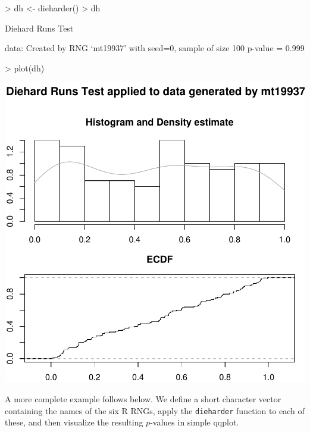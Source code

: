 \documentclass[12pt]{article}
\begin{document}
\begin{center}
\begin{footnotesize}
%
\begin{Schunk}
\begin{Sinput}
> dh <- dieharder()
> dh
\end{Sinput}
\begin{Soutput}
	Diehard Runs Test

data:  Created by RNG `mt19937' with seed=0, sample of size 100 
p-value = 0.999
\end{Soutput}
\begin{Sinput}
> plot(dh)
\end{Sinput}
\end{Schunk}
\includegraphics{RDieHarder-rd-example}
% 
\end{footnotesize}
\end{center}

A more complete example follows below.  We define a short character vector
containing the names of the six R RNGs, apply the \texttt{dieharder} function to
each of these, and then visualize the resulting $p$-values in simple qqplot.
\end{document}

